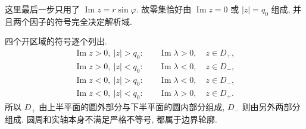 这里最后一步只用了 $\operatorname{Im}z=r\sin\varphi$. 故零集恰好由 $\operatorname{Im}z=0$ 或 $|z|=q_0$ 组成, 并且两个因子的符号完全决定解析域.
\par\smallskip\noindent 四个开区域的符号逐个列出.\quad
\begin{align*}
\operatorname{Im}z>0,\ |z|>q_0:
&\quad\operatorname{Im}\lambda>0,\quad z\in D_+,\\
\operatorname{Im}z>0,\ |z|<q_0:
&\quad\operatorname{Im}\lambda<0,\quad z\in D_-,\\
\operatorname{Im}z<0,\ |z|>q_0:
&\quad\operatorname{Im}\lambda<0,\quad z\in D_-,\\
\operatorname{Im}z<0,\ |z|<q_0:
&\quad\operatorname{Im}\lambda>0,\quad z\in D_+.
\end{align*}
所以 $D_+$ 由上半平面的圆外部分与下半平面的圆内部分组成, $D_-$ 则由另外两部分组成. 圆周和实轴本身不满足严格不等号, 都属于边界轮廓.


